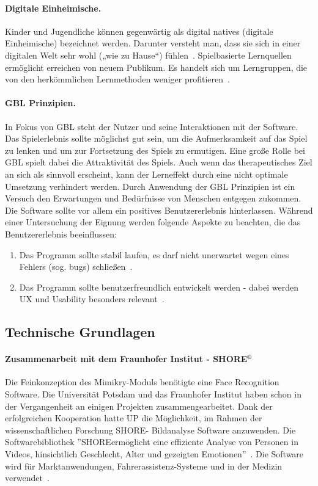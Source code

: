 \paragraph{Digitale Einheimische.}Kinder und Jugendliche können gegenwärtig als digital natives (digitale Einheimische) bezeichnet werden. Darunter versteht man, dass sie sich in einer digitalen Welt sehr wohl („wie zu Hause“) fühlen~\cite{Turula.2010}. 
Spielbasierte Lernquellen ermöglicht erreichen von neuem Publikum. Es handelt sich um Lerngruppen, die von den herkömmlichen Lernmethoden weniger profitieren~\cite{Prensky2003DigitalGL}.
\paragraph{GBL Prinzipien.}
In Fokus von GBL steht der Nutzer und seine Interaktionen mit der Software. Das Spielerlebnis sollte möglichst gut sein, um die Aufmerksamkeit auf das Spiel zu lenken und um zur Fortsetzung des Spiels zu ermutigen. Eine große Rolle bei GBL spielt dabei die Attraktivität des Spiels. Auch wenn das therapeutisches Ziel an sich als sinnvoll erscheint, kann der Lerneffekt durch eine nicht optimale Umsetzung verhindert werden. 
Durch Anwendung der GBL Prinzipien ist ein Versuch den Erwartungen und Bedürfnisse von Menschen entgegen zukommen. Die Software sollte vor allem ein positives Benutzererlebnis hinterlassen. Während einer Untersuchung der Eignung werden folgende Aspekte zu beachten, die das Benutzererlebnis beeinflussen:
\begin{enumerate}
    \item Das Programm sollte stabil laufen, es darf nicht unerwartet wegen eines Fehlers (sog. bugs) schließen~\cite{Shiratuddin2011DesigningUE}.
    \item Das Programm sollte benutzerfreundlich entwickelt werden - dabei werden UX und Usability besonders relevant~\cite{Shiratuddin2011DesigningUE}.
\end{enumerate}

\subsection{Technische Grundlagen}
\paragraph{{Zusammenarbeit mit dem Fraunhofer Institut - SHORE$^\text{\textregistered}$}}
Die Feinkonzeption des Mimikry-Moduls benötigte eine Face Recognition Software. 
Die Universität Potsdam und das Fraunhofer Institut haben schon in der Vergangenheit an einigen Projekten zusammengearbeitet. Dank der erfolgreichen Kooperation hatte UP die Möglichkeit, im Rahmen der wissenschaftlichen Forschung SHORE\re - Bildanalyse Software anzuwenden. 
Die Softwarebibliothek ''SHORE\re ermöglicht eine effiziente Analyse von Personen in Videos, hinsichtlich Geschlecht, Alter und gezeigten Emotionen''~\cite{shore}. Die Software wird für Marktanwendungen, Fahrerassistenz-Systeme und in der Medizin verwendet~\cite{shore}.

